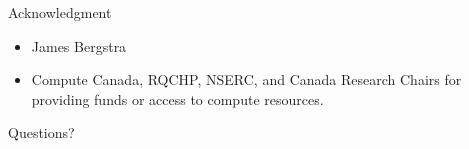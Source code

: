 \documentclass[utf8x,xcolor=pdftex,dvipsnames,table]{beamer}
\begin{document}
\begin{frame}{Acknowledgment}
\begin{itemize}
\item James Bergstra
\item Compute Canada, RQCHP, NSERC, and Canada Research Chairs for providing funds or access to compute resources.
\end{itemize}
\end{frame}

\begin{frame}
\begin{center}
\Huge
Questions?
\end{center}
\end{frame}
\end{document}
